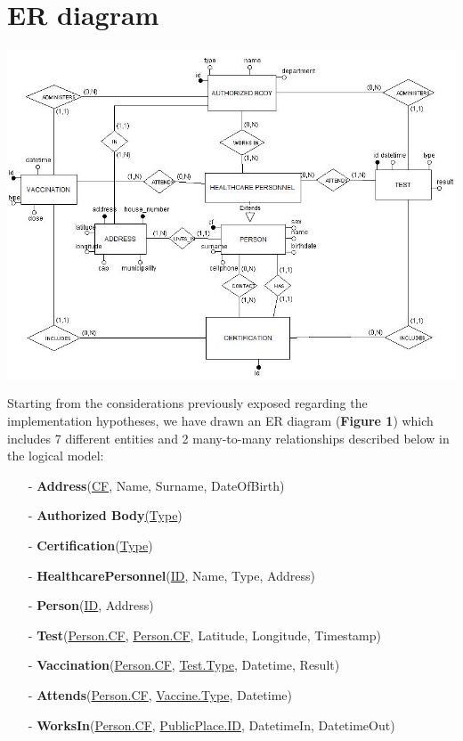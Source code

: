 \documentclass[a4paper,12pt]{article}
\begin{document}
\section{ER diagram}
\paragraph{}
	\begin{center}
 		\includegraphics[width = 15 cm]{ER_diagram.png}
	\end{center}
\par Starting from the considerations previously exposed regarding the implementation hypotheses, we have drawn an ER diagram (\textbf{Figure 1}) which includes 7 different entities and 2 many-to-many relationships described below in the logical model: \par
  \begin{itemize}[noitemsep]
   	\item[-]	\textbf{Address}(\underline{CF}, Name, Surname, DateOfBirth)
	\item[-]	\textbf{Authorized Body}\underline{(Type})
	\item[-]	\textbf{Certification}(\underline{Type})
	\item[-]	\textbf{HealthcarePersonnel}(\underline{ID}, Name, Type, Address)
	\item[-]	\textbf{Person}(\underline{ID}, Address)
	\item[-]	\textbf{Test}(\underline{Person.CF}, \underline{Person.CF}, Latitude, Longitude, Timestamp)
	\item[-]	\textbf{Vaccination}(\underline{Person.CF}, \underline{Test.Type}, Datetime, Result)
	\item[-]	\textbf{Attends}(\underline{Person.CF}, \underline{Vaccine.Type}, Datetime)
	\item[-]	\textbf{WorksIn}(\underline{Person.CF}, \underline{PublicPlace.ID}, DatetimeIn, DatetimeOut)
  \end{itemize} \par
\end{document}
